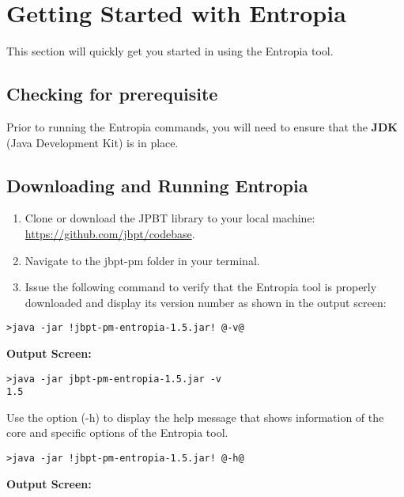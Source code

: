 \section*{Getting Started with Entropia}
\label{sec:start}
This section will quickly get you started in using the Entropia tool.

\subsection{Checking for prerequisite}
Prior to running the Entropia commands, you will need to ensure that the \textbf{JDK} (Java Development Kit) is in place.
\subsection{Downloading and Running Entropia}

\begin{enumerate}
\itemsep0em 
\item Clone or download the JPBT library to your local machine: \url{https://github.com/jbpt/codebase}.
\item Navigate to the jbpt-pm folder in your terminal.
\item Issue the following command to verify that the Entropia tool is properly downloaded and display its version number as shown in the output screen:
\end{enumerate}
\begin{lstlisting}[style=CL]
>java -jar !jbpt-pm-entropia-1.5.jar! @-v@
\end{lstlisting}
\textbf{Output Screen:}
\begin{lstlisting}[style=DOS]
>java -jar jbpt-pm-entropia-1.5.jar -v
1.5
\end{lstlisting}
\smallbreak
Use the option (\textcolor{darkcandyapplered}{\footnotesize\ttfamily-h}) to display the help message that shows information of the core and specific options of the Entropia tool.
\begin{lstlisting}[style=CL]
>java -jar !jbpt-pm-entropia-1.5.jar! @-h@
\end{lstlisting}
\textbf{Output Screen:}%

